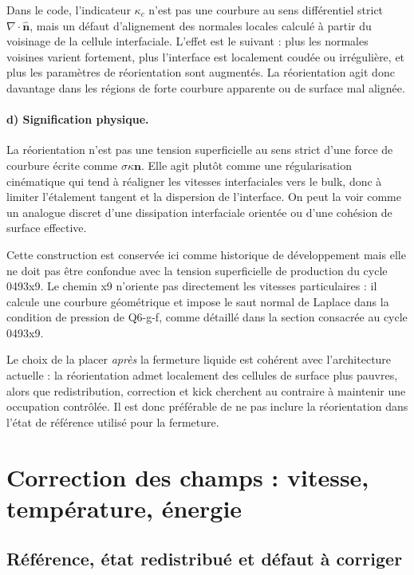 \documentclass[11pt,a4paper]{article}
\begin{document}
Dans le code, l'indicateur $\kappa_c$ n'est pas une courbure au sens différentiel strict $\nabla\cdot\widehat{\bm n}$, mais un défaut d'alignement des normales locales calculé à partir du voisinage de la cellule interfaciale. L'effet est le suivant : plus les normales voisines varient fortement, plus l'interface est localement coudée ou irrégulière, et plus les paramètres de réorientation sont augmentés. La réorientation agit donc davantage dans les régions de forte courbure apparente ou de surface mal alignée.

\paragraph{d) Signification physique.}
La réorientation n'est pas une tension superficielle au sens strict d'une force de courbure écrite comme $\sigma \kappa \bm{n}$. Elle agit plutôt comme une régularisation cinématique qui tend à réaligner les vitesses interfaciales vers le bulk, donc à limiter l'étalement tangent et la dispersion de l'interface. On peut la voir comme un analogue discret d'une dissipation interfaciale orientée ou d'une cohésion de surface effective.

Cette construction est conservée ici comme historique de développement mais elle ne doit pas être confondue avec la tension superficielle de production du cycle 0493x9. Le chemin x9 n'oriente pas directement les vitesses particulaires : il calcule une courbure géométrique et impose le saut normal de Laplace dans la condition de pression de Q6-g-f, comme détaillé dans la section consacrée au cycle 0493x9.

Le choix de la placer \emph{après} la fermeture liquide est cohérent avec l'architecture actuelle : la réorientation admet localement des cellules de surface plus pauvres, alors que redistribution, correction et kick cherchent au contraire à maintenir une occupation contrôlée. Il est donc préférable de ne pas inclure la réorientation dans l'état de référence utilisé pour la fermeture.

\section{Correction des champs : vitesse, température, énergie}

\subsection{Référence, état redistribué et défaut à corriger}
\end{document}
